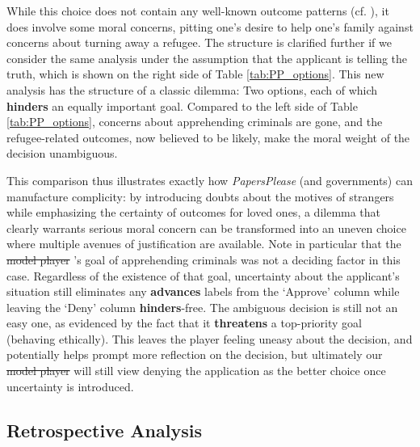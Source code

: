 \documentclass[arts,article,submit,moreauthors,pdftex,10pt,a4paper]{Definitions/mdpi}
\newcommand{\advances}{\textbf{\color{advances}advances}}
\newcommand{\threatens}{\textbf{\color{threatens}threatens}}
\newcommand{\hinders}{\textbf{\color{hinders}hinders}}
\providecommand{\DIFadd}[1]{{\protect\color{blue}\uwave{#1}}} %
\providecommand{\DIFdel}[1]{{\protect\color{red}\sout{#1}}}                      %
\providecommand{\DIFaddbegin}{} %
\providecommand{\DIFaddend}{} %
\providecommand{\DIFdelbegin}{} %
\providecommand{\DIFdelend}{} %
\begin{document}
While this choice does not contain any well-known outcome patterns (cf. \cite{mawhorter2014towards}), it does involve some moral concerns, pitting one's desire to help one's family against concerns about turning away a refugee.
%
The structure is clarified further if we consider the same analysis under the assumption that the applicant is telling the truth, which is shown on the right side of Table \ref{tab:PP_options}.
%
This new analysis has the structure of a classic dilemma: Two options, each of which \hinders{} an equally important goal.
%
Compared to the left side of Table \ref{tab:PP_options}, concerns about apprehending criminals are gone, and the refugee-related outcomes, now believed to be likely, make the moral weight of the decision unambiguous.


This comparison thus illustrates exactly how \emph{Papers\DIFaddbegin \DIFadd{, }\DIFaddend Please} (and governments) can manufacture complicity: by introducing doubts about the motives of strangers while emphasizing the certainty of outcomes for loved ones, a dilemma that clearly warrants serious moral concern can be transformed into an uneven choice where multiple avenues of justification are available.
%
Note in particular that the \DIFdelbegin \DIFdel{model player }\DIFdelend \DIFaddbegin \DIFadd{player model}\DIFaddend 's goal of apprehending criminals was not a deciding factor in this case.
%
Regardless of the existence of that goal, uncertainty about the applicant's situation still eliminates any \advances{} labels from the `Approve' column while leaving the `Deny' column \hinders{}-free.
%
The ambiguous decision is still not an easy one, as evidenced by the fact that it \threatens{} a top-priority goal (behaving ethically).
%
This leaves the player feeling uneasy about the decision, and potentially helps prompt more reflection on the decision, but ultimately our \DIFdelbegin \DIFdel{model player }\DIFdelend \DIFaddbegin \DIFadd{player model }\DIFaddend will still view denying the application as the better choice once uncertainty is introduced.

\subsection{Retrospective Analysis}
\end{document}
